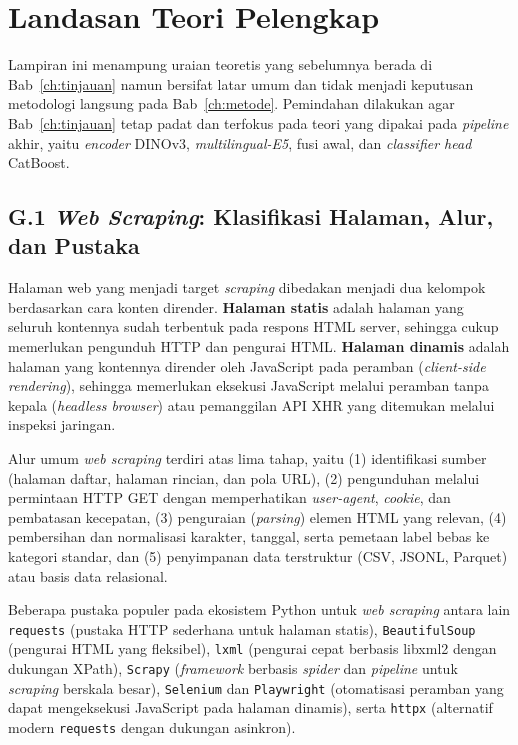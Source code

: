 \chapter{Landasan Teori Pelengkap}
\label{app:teori-pelengkap}

Lampiran ini menampung uraian teoretis yang sebelumnya berada di Bab~\ref{ch:tinjauan} namun bersifat latar umum dan tidak menjadi keputusan metodologi langsung pada Bab~\ref{ch:metode}. Pemindahan dilakukan agar Bab~\ref{ch:tinjauan} tetap padat dan terfokus pada teori yang dipakai pada \textit{pipeline} akhir, yaitu \textit{encoder} DINOv3, \textit{multilingual-E5}, fusi awal, dan \textit{classifier head} CatBoost.

\section*{G.1 \textit{Web Scraping}: Klasifikasi Halaman, Alur, dan Pustaka}
\label{app:webscraping-detail}

Halaman web yang menjadi target \textit{scraping} dibedakan menjadi dua kelompok berdasarkan cara konten dirender. \textbf{Halaman statis} adalah halaman yang seluruh kontennya sudah terbentuk pada respons HTML server, sehingga cukup memerlukan pengunduh HTTP dan pengurai HTML. \textbf{Halaman dinamis} adalah halaman yang kontennya dirender oleh JavaScript pada peramban (\textit{client-side rendering}), sehingga memerlukan eksekusi JavaScript melalui peramban tanpa kepala (\textit{headless browser}) atau pemanggilan API XHR yang ditemukan melalui inspeksi jaringan.

Alur umum \textit{web scraping} terdiri atas lima tahap, yaitu (1) identifikasi sumber (halaman daftar, halaman rincian, dan pola URL), (2) pengunduhan melalui permintaan HTTP GET dengan memperhatikan \textit{user-agent}, \textit{cookie}, dan pembatasan kecepatan, (3) penguraian (\textit{parsing}) elemen HTML yang relevan, (4) pembersihan dan normalisasi karakter, tanggal, serta pemetaan label bebas ke kategori standar, dan (5) penyimpanan data terstruktur (CSV, JSONL, Parquet) atau basis data relasional.

Beberapa pustaka populer pada ekosistem Python untuk \textit{web scraping} antara lain \texttt{requests} (pustaka HTTP sederhana untuk halaman statis), \texttt{BeautifulSoup} (pengurai HTML yang fleksibel), \texttt{lxml} (pengurai cepat berbasis libxml2 dengan dukungan XPath), \texttt{Scrapy} (\textit{framework} berbasis \textit{spider} dan \textit{pipeline} untuk \textit{scraping} berskala besar), \texttt{Selenium} dan \texttt{Playwright} (otomatisasi peramban yang dapat mengeksekusi JavaScript pada halaman dinamis), serta \texttt{httpx} (alternatif modern \texttt{requests} dengan dukungan asinkron).

